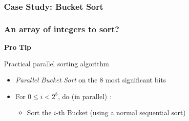 \documentclass[xcolor={x11names,svgnames},x11names,svgnames]{beamer}
\begin{document}
  
  
\begin{frame}[label=radix_curve]
  \frametitle{Case Study: Bucket Sort}

\end{frame}


\begin{frame}[label=radix_code]
  \frametitle{An array of integers to sort?}
  
    \begin{center}
      \Huge \bf \alert{Pro Tip}
  \end{center}

  \begin{exampleblock}{Practical parallel sorting algorithm}
    \begin{itemize}
  \item \emph{Parallel Bucket Sort} on the 8 most significant bits
  \item For $0 \leq i < 2^8$, do (in parallel) :
    \begin{itemize}
    \item Sort the $i$-th Bucket (using a normal sequential sort)
    \end{itemize}
  \end{itemize}
\end{exampleblock}
\end{frame}
\end{document}
